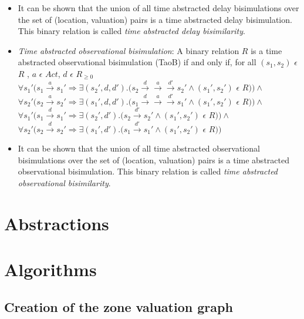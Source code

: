 \documentclass{article}
\begin{document}
\begin{itemize}
\item It can be shown that the union of all time abstracted delay
  bisimulations over the set of (location, valuation) pairs is a
  time abstracted delay bisimulation. This binary relation is called
  \textit{time abstracted delay bisimilarity}.

\item \emph{Time abstracted observational bisimulation}: A binary relation
  $R$ is a time abstracted observational bisimulation (TaoB) if and only if, for all
  $(s_1, s_2)$ $\epsilon$ $R$ , $a$ $\epsilon$ $Act $, $d$ $\epsilon$ $R_{\ge 0}$\\
  $\forall s_1' (s_1 \xrightarrow{a} s_1' \Rightarrow \exists (s_2',
  d, d') . (s_2 \xrightarrow{d} \xrightarrow{a} \xrightarrow{d'} s_2'
  \wedge (s_1', s_2')$ $\epsilon$ $R ) ) \wedge $ \\
  $\forall s_2' (s_2 \xrightarrow{a} s_2' \Rightarrow \exists (s_1',
  d, d') . (s_1 \xrightarrow{d} \xrightarrow{a} \xrightarrow{d'} s_1'
  \wedge (s_1', s_2')$ $\epsilon$ $R ) ) \wedge $ \\
  $\forall s_1' (s_1 \xrightarrow{d} s_1' \Rightarrow \exists (s_2',
  d')
  . (s_2 \xrightarrow{d'} s_2' \wedge (s_1', s_2')$ $\epsilon$ $R ) )
  \wedge $ \\
  $\forall s_2' (s_2 \xrightarrow{d} s_2' \Rightarrow \exists (s_1', d')
  . (s_1 \xrightarrow{d'} s_1' \wedge (s_1', s_2')$ $\epsilon$ $R ) ) $ \\

\item It can be shown that the union of all time abstracted observational
  bisimulations over the set of (location, valuation) pairs is a
  time abstracted observational bisimulation. This binary relation is called
  \textit{time abstracted observational bisimilarity}.

\end{itemize}

\section{Abstractions}



\section{Algorithms}

\subsection{Creation of the zone valuation graph}
\end{document}
